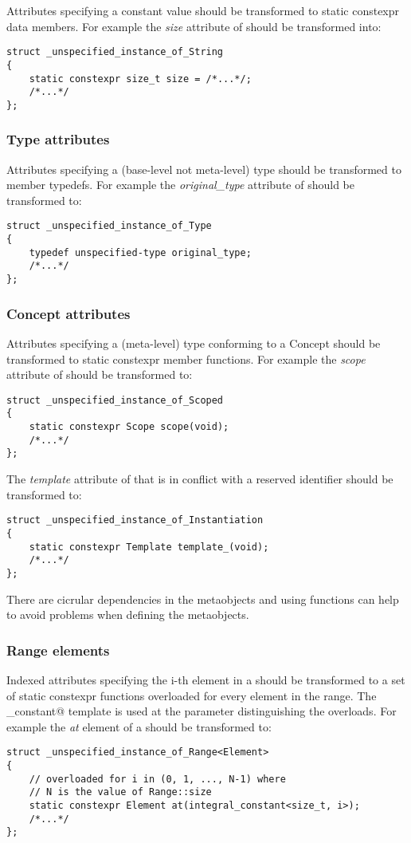 Attributes specifying a constant value should be transformed to
static constexpr data members.
For example the {\em size} attribute of {}
should be transformed into:
\begin{verbatim}
struct _unspecified_instance_of_String
{
	static constexpr size_t size = /*...*/;
	/*...*/
};
\end{verbatim}

\subsubsection{Type attributes}

Attributes specifying a (base-level not meta-level) type should be
transformed to member typedefs.
For example the {\em original\_type} attribute of {}
should be transformed to:
\begin{verbatim}
struct _unspecified_instance_of_Type
{
	typedef unspecified-type original_type;
	/*...*/
};
\end{verbatim}

\subsubsection{Concept attributes}

Attributes specifying a (meta-level) type conforming to a Concept should be
transformed to static constexpr member functions.
For example the {\em scope} attribute of {}
should be transformed to:
\begin{verbatim}
struct _unspecified_instance_of_Scoped
{
	static constexpr Scope scope(void);
	/*...*/
};
\end{verbatim}
The {\em template} attribute of {} that is in conflict
with a reserved identifier should be transformed to:
\begin{verbatim}
struct _unspecified_instance_of_Instantiation
{
	static constexpr Template template_(void);
	/*...*/
};
\end{verbatim}

There are cicrular dependencies in the metaobjects and using functions
can help to avoid problems when defining the metaobjects.

\subsubsection{Range elements}

Indexed attributes specifying the i-th element in a {}
should be transformed to a set of static constexpr functions overloaded
for every element in the range. The \verb@integral_constant@ template
is used at the parameter distinguishing the overloads.
For example the {\em at} element of a {} should
be transformed to:
\begin{verbatim}
struct _unspecified_instance_of_Range<Element>
{
	// overloaded for i in (0, 1, ..., N-1) where
	// N is the value of Range::size
	static constexpr Element at(integral_constant<size_t, i>);
	/*...*/
};
\end{verbatim}


